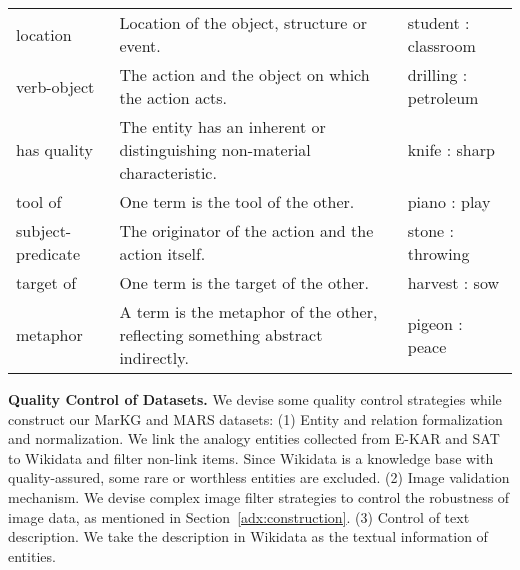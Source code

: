 \documentclass{article} \usepackage{iclr2023_conference,times}
\newcommand{\data}{MARS}
\newcommand{\kg}{MarKG}
\begin{document}
\begin{table*}[!htp]
{\begin{tabular}{lp{9.0cm}l}
location & Location of the object, structure or event. & student : classroom \\
verb-object & The action and the object on which the action acts. & drilling : petroleum \\
has quality & The entity has an inherent or distinguishing non-material characteristic. & knife : sharp \\
tool of & One term is the tool of the other.  & piano : play \\
subject-predicate & The originator of the action and the action itself.  & stone : throwing \\
target of & One term is the target of the other. & harvest : sow \\
metaphor & A term is the metaphor of the other, reflecting something abstract indirectly. & pigeon : peace \\

\bottomrule
\end{tabular}
}
\caption{The complete relations with definitions, examples of {\data}. Some relations and definitions refer to~\citep{E-KAR} and Wikidata Properties.}
\label{tab:adx_complete_relation}
\end{table*}


\textbf{Quality Control of Datasets.}
We devise some quality control strategies while construct our {\kg} and {\data} datasets: 
(1) Entity and relation formalization and normalization. We link the analogy entities collected from E-KAR and SAT to Wikidata and filter non-link items.
Since Wikidata is a knowledge base with quality-assured, some rare or worthless entities are excluded.
(2) Image validation mechanism. We devise complex image filter strategies to control the robustness of image data, as mentioned in Section~\ref{adx:construction}.
(3) Control of text description. We take the description in Wikidata as the textual information of entities.
\end{document}
